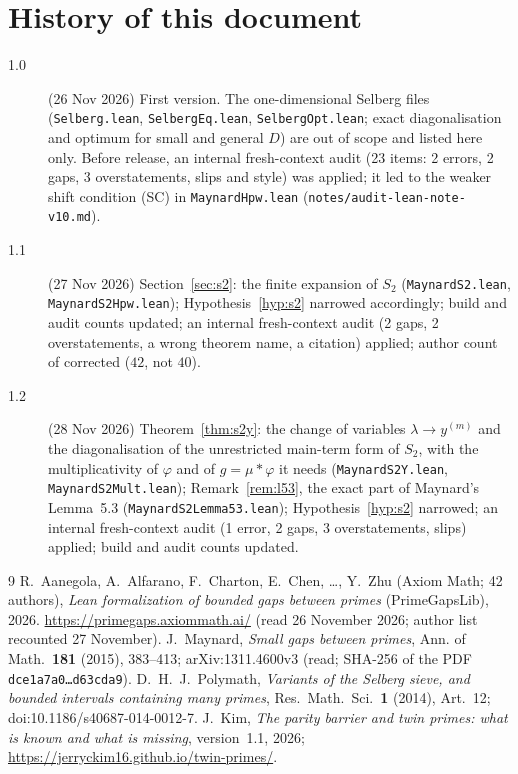 \documentclass[11pt]{amsart}
\theoremstyle{definition}
\theoremstyle{remark}
\newcommand{\tl}[1]{\texttt{#1}}
\begin{document}
\section{History of this document}\label{app:history}
\begin{description}
\item[1.0] (26 Nov 2026) First version. The one-dimensional Selberg files
(\tl{Selberg.lean}, \tl{SelbergEq.lean}, \tl{SelbergOpt.lean}; exact
diagonalisation and optimum for small and general $D$) are out of scope and
listed here only. Before release, an internal fresh-context audit (23 items:
2 errors, 2 gaps, 3 overstatements, slips and style) was applied; it led to
the weaker shift condition (SC) in \tl{MaynardHpw.lean}
(\tl{notes/audit-lean-note-v10.md}).
\item[1.1] (27 Nov 2026) Section~\ref{sec:s2}: the finite expansion of $S_2$
(\tl{MaynardS2.lean}, \tl{MaynardS2Hpw.lean}); Hypothesis~\ref{hyp:s2} narrowed
accordingly; build and audit counts updated; an internal fresh-context audit (2 gaps, 2
overstatements, a wrong theorem name, a citation) applied; author count of \cite{Axiom26} corrected ($42$, not $40$).
\item[1.2] (28 Nov 2026) Theorem~\ref{thm:s2y}: the change of variables $\lambda\to y^{(m)}$ and the
diagonalisation of the unrestricted main-term form of $S_2$, with the multiplicativity of $\varphi$ and of
$g=\mu*\varphi$ it needs (\tl{MaynardS2Y.lean}, \tl{MaynardS2Mult.lean}); Remark~\ref{rem:l53}, the exact part of Maynard's
Lemma~5.3 (\tl{MaynardS2Lemma53.lean}); Hypothesis~\ref{hyp:s2} narrowed; an internal fresh-context audit
(1 error, 2 gaps, 3 overstatements, slips) applied;
build and audit counts updated.
\end{description}

\begin{thebibliography}{9}
 R.~Aanegola, A.~Alfarano, F.~Charton, E.~Chen, \dots, Y.~Zhu (Axiom Math; 42 authors),
\emph{Lean formalization of bounded gaps between primes} (PrimeGapsLib), 2026.
\url{https://primegaps.axiommath.ai/} (read 26 November 2026; author list recounted 27 November).
 J.~Maynard, \emph{Small gaps between primes}, Ann. of Math.\
\textbf{181} (2015), 383--413; arXiv:1311.4600v3 (read; SHA-256 of the PDF
\texttt{dce1a7a0\dots d63cda9}).
 D.~H.~J.~Polymath, \emph{Variants of the Selberg sieve, and
bounded intervals containing many primes}, Res.\ Math.\ Sci.\ \textbf{1}
(2014), Art.~12; doi:10.1186/s40687-014-0012-7.
 J.~Kim, \emph{The parity barrier and twin primes: what is known
and what is missing}, version~1.1, 2026; \url{https://jerryckim16.github.io/twin-primes/}.
\end{thebibliography}
\end{document}
